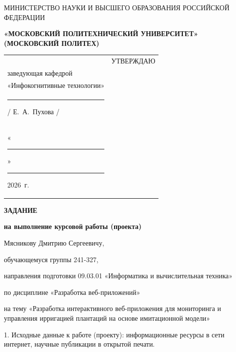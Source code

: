 \documentclass[14pt, a4paper]{extarticle}
\begin{document}
    \pagestyle{empty}


    \begin{center}
        {\small МИНИСТЕРСТВО НАУКИ И ВЫСШЕГО ОБРАЗОВАНИЯ РОССИЙСКОЙ ФЕДЕРАЦИИ}


    {\small \textbf{«МОСКОВСКИЙ ПОЛИТЕХНИЧЕСКИЙ УНИВЕРСИТЕТ»}} \\
    {\small \textbf{(МОСКОВСКИЙ ПОЛИТЕХ)}}
    \end{center}

    \begin{tabularx}{\textwidth}{@{} p{} p{} @{}}
     &
     \raggedright
     УТВЕРЖДАЮ                          \\
     заведующая кафедрой                \\
     «Инфокогнитивные технологии»       \\[0.3cm]

     \rule{3cm}{0.4pt} / Е.~А.~Пухова / \\[0.1cm]

     «\rule{0.8cm}{0.4pt}» \rule{3cm}{0.4pt} 2026~г.
    \end{tabularx}


    \begin{center}

        { \large \textbf{ЗАДАНИЕ}}

    \textbf{на выполнение курсовой работы (проекта)}

    Мясникову Дмитрию Сергеевичу,

    \end{center}

    обучающемуся группы 241-327,

    направления подготовки 09.03.01 «Информатика и вычислительная техника»

    по дисциплине «Разработка веб-приложений»

    на тему «Разработка интерактивного веб-приложения для мониторинга
    и управления ирригацией плантаций
    на основе имитационной модели»


    1. Исходные данные к работе (проекту): информационные ресурсы в сети
    интернет, научные публикации в открытой печати.
\end{document}
